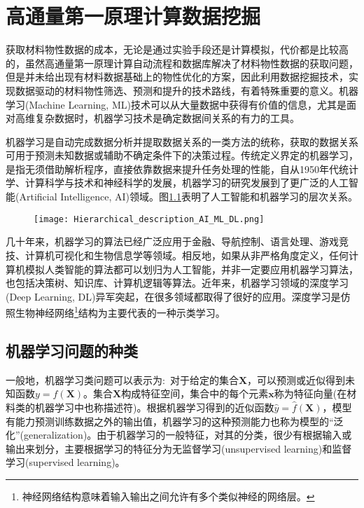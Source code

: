 \chapter{高通量第一原理计算数据挖掘}\label{chap:datamining} 
获取材料物性数据的成本，无论是通过实验手段还是计算模拟，代价都是比较高的，虽然高通量第一原理计算自动流程和数据库解决了材料物性数据的获取问题，但是并未给出现有材料数据基础上的物性优化的方案，因此利用数据挖掘技术，实现数据驱动的材料物性筛选、预测和提升的技术路线，有着特殊重要的意义。机器学习\textrm{(Machine Learning, ML)}技术可以从大量数据中获得有价值的信息，尤其是面对高维复杂数据时，机器学习技术是确定数据间关系的有力的工具。

机器学习是自动完成数据分析并提取数据关系的一类方法的统称，获取的数据关系可用于预测未知数据或辅助不确定条件下的决策过程\cite{ML_2012}。传统定义界定的机器学习，是指无须借助解析程序，直接依靠数据来提升任务处理的性能\cite{IBMJRD3-211_1959}，自从1950年代统计学、计算科学与技术和神经科学的发展，机器学习的研究发展到了更广泛的人工智能\textrm{(Artificial Intelligence, AI)}领域。图\ref{AI-ML}表明了人工智能和机器学习的层次关系。
\begin{figure}[h!]
\centering
\vspace*{-0.1in}
\texttt{[image: Hierarchical\_description\_AI\_ML\_DL.png]}
\caption{\fontsize{7.2pt}{4.2pt}}%
\label{AI-ML}
\end{figure}

几十年来，机器学习的算法已经广泛应用于金融、导航控制、语言处理、游戏竞技、计算机可视化和生物信息学等领域。相反地，如果从非严格角度定义，任何计算机模拟人类智能的算法都可以划归为人工智能，并非一定要应用机器学习算法，也包括决策树、知识库、计算机逻辑等算法。近年来，机器学习领域的深度学习\textrm{(Deep Learning, DL)}异军突起，在很多领域都取得了很好的应用\cite{DL_2016}。深度学习是仿照生物神经网络\footnote{神经网络结构意味着输入输出之间允许有多个类似神经的网络层。}结构为主要代表的一种示类学习。

\section{机器学习问题的种类}
一般地，机器学习类问题可以表示为:~对于给定的集合$\mathbf{X}$，可以预测或近似得到未知函数$y=f(\mathbf{X})$\cite{ML-CI}。集合$\mathbf{X}$构成特征空间，集合中的每个元素$\mathbf{x}$称为特征向量(在材料类的机器学习中也称描述符)。根据机器学习得到的近似函数$\hat{y}=\hat{f}(\mathbf{X})$，模型有能力预测训练数据之外的输出值，机器学习的这种预测能力也称为模型的“泛化”\textrm{(generalization)}。由于机器学习的一般特征，对其的分类，很少有根据输入或输出来划分，主要根据学习的特征分为无监督学习\textrm{(unsupervised learning)}和监督学习\textrm{(supervised learning)}。

